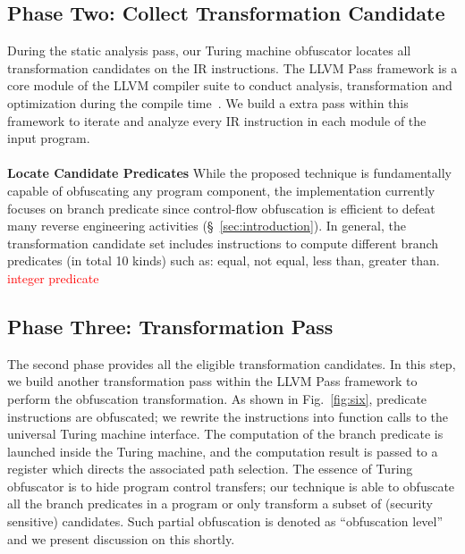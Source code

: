 \documentclass[lnicst]{svmultln}
\newcommand{\F}{Fig.}
\begin{document}
\subsection{Phase Two: Collect Transformation Candidate}
During the static analysis pass, our Turing machine obfuscator locates all
transformation candidates on the IR instructions. The LLVM Pass framework is a
core module of the LLVM compiler suite to conduct analysis, transformation and
optimization during the compile time~\cite{llvmpass}. We build a extra pass
within this framework to iterate and analyze every IR instruction in each module
of the input program. 
\\\\
\noindent \textbf{Locate Candidate Predicates} While the proposed technique is
fundamentally capable of obfuscating any program component, the implementation
currently focuses on branch predicate since control-flow obfuscation is
efficient to defeat many reverse engineering activities
(\S~\ref{sec:introduction}). In general, the transformation candidate set
includes instructions to compute different branch predicates (in total 10 kinds)
such as: equal, not equal, less than, greater than. \textcolor{red}{integer
  predicate}

\subsection{Phase Three: Transformation Pass}
The second phase provides all the eligible transformation candidates. In this
step, we build another transformation pass within the LLVM Pass framework to
perform the obfuscation transformation. As shown in \F~\ref{fig:six}, predicate
instructions are obfuscated; we rewrite the instructions into function calls to
the universal Turing machine interface. The computation of the branch predicate
is launched inside the Turing machine, and the computation result is passed to a
register which directs the associated path selection. The essence of Turing
obfuscator is to hide program control transfers; our technique is able to
obfuscate all the branch predicates in a program or only transform a subset of
(security sensitive) candidates. Such partial obfuscation is denoted as
``obfuscation level'' and we present discussion on this shortly.
\end{document}
